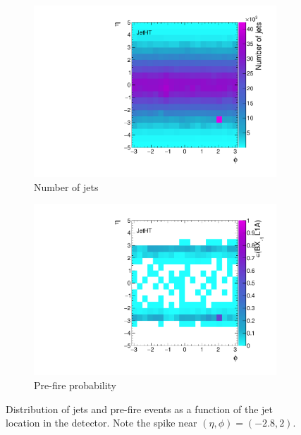 \begin{figure}[]
    \begin{center}
        \begin{subfigure}[t]{0.49\textwidth}
            \includegraphics[width=\textwidth]{figures/vbf/triggers/JetHT_inclusive_egiso_etaphi_den.pdf}
            \caption{Number of jets}
        \end{subfigure}
        \begin{subfigure}[t]{0.49\textwidth}
            \includegraphics[width=\textwidth]{figures/vbf/triggers/JetHT_inclusive_egiso_etaphi_ratio.pdf}
            \caption{Pre-fire probability}
        \end{subfigure}
        \caption{Distribution of jets and pre-fire events as a function of the jet location in the detector.
                 Note the spike near $(\eta,\phi) = (-2.8,2)$. }
        \label{fig:vbf:pre_eff2_etaphi}
    \end{center}
\end{figure}

